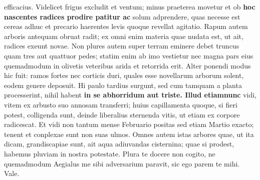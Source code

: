 efficacius. Videlicet frigus excludit et ventum; minus praeterea movetur et ob \textbf{hoc \textbf{nascentes radices prodire patitur} ac} solum adprendere, quas necesse est cereas adhuc et precario haerentes levis quoque revellat agitatio. Rapum autem arboris antequam obruat radit; ex omni enim materia quae nudata est, ut ait, radices exeunt novae. Non plures autem super terram eminere debet truncus quam tres aut quattuor pedes; statim enim ab imo vestietur nec magna pars eius quemadmodum in olivetis veteribus arida et retorrida erit. Alter ponendi modus hic fuit: ramos fortes nec corticis duri, quales esse novellarum arborum solent, eodem genere deposuit. Hi paulo tardius surgunt, sed cum tamquam a planta processerint, nihil habent \textbf{in se abhorridum aut triste. Illud etiamnunc} vidi, vitem ex arbusto suo annosam transferri; huius capillamenta quoque, si fieri potest, colligenda sunt, deinde liberalius sternenda vitis, ut etiam ex corpore radicescat. Et vidi non tantum mense Februario positas sed etiam Martio exacto; tenent et conplexae sunt non suas ulmos. Omnes autem istas arbores quae, ut ita dicam, grandiscapiae sunt, ait aqua adiuvandas cisternina; quae si prodest, habemus pluviam in nostra potestate. Plura te docere non cogito, ne quemadmodum Aegialus me sibi adversarium paravit, sic ego parem te mihi. Vale. 

